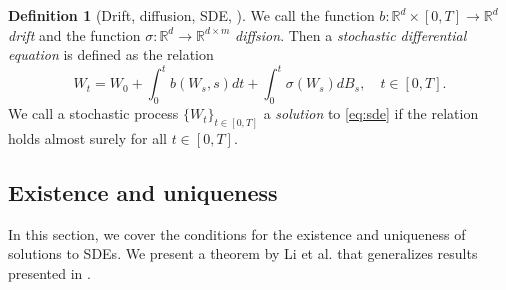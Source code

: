 \documentclass[12pt]{article}
\newtheorem{theorem}{Theorem}[section]
\theoremstyle{definition}
\newtheorem{definition}[definition]{Definition}
\numberwithin{equation}{section}
\newcommand{\R}{\mathbb{R}}
\newcommand{\ev}[1]{\mathbb{E}\left[{#1}\right]}
\begin{document}
\begin{definition}[Drift, diffusion, SDE, ]
  We call the function $b : \R^d \times [0,T] \rightarrow \R^d$ \emph{drift} and the function $\sigma : \R^d \rightarrow \R^{d \times m}$ \emph{diffsion}. Then a \emph{stochastic differential equation} is defined as the relation
  \begin{equation}
    \label{eq:sde}
    W_t = W_0 + \int_0^t b(W_s, s) dt + \int_0^t \sigma(W_s)dB_s, \quad t \in [0,T].
  \end{equation}
  We call a stochastic process $\{W_t\}_{t \in [0,T]}$ a \emph{solution} to \eqref{eq:sde} if the relation holds almost surely for all $t \in [0,T]$.
\end{definition}


\subsection{Existence and uniqueness}
\label{subsec:SDEExistenceUniqueness}
In this section, we cover the conditions for the existence and uniqueness of solutions to SDEs. We present a theorem by Li et al. \cite{liStochasticModifiedEquations2019} that generalizes results presented in \cite{oksendalStochasticDifferentialEquations2003}. 
\end{document}
